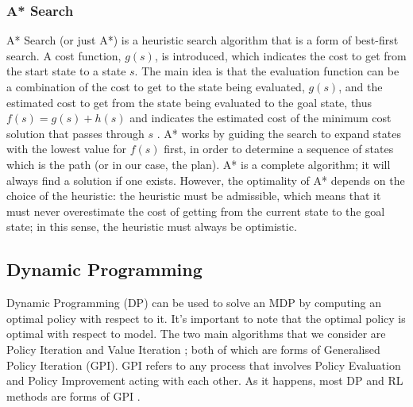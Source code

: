 \subsubsection{A* Search}
\label{sec:astar}
A* Search (or just A*) \cite{4082128} is a heuristic search algorithm that is a form of best-first search. A cost function, $g(s)$, is introduced, which indicates the cost to get from the start state to a state $s$. The main idea is that the evaluation function can be a combination of the cost to get to the state being evaluated, $g(s)$, and the estimated cost to get from the state being evaluated to the goal state, thus $f(s) = g(s) + h(s)$ and indicates the estimated cost of the minimum cost solution that passes through $s$ \cite{DBLP:books/aw/RN2020}. A* works by guiding the search to expand states with the lowest value for $f(s)$ first, in order to determine a sequence of states which is the path (or in our case, the plan). A* is a complete algorithm; it will always find a solution if one exists. However, the optimality of A* depends on the choice of the heuristic: the heuristic must be admissible, which means that it must never overestimate the cost of getting from the current state to the goal state; in this sense, the heuristic must always be optimistic.
\\
\subsection{Dynamic Programming}
Dynamic Programming (DP) \cite{Bellman:1957, DBLP:books/lib/Bertsekas05} can be used to solve an MDP by computing an optimal policy with respect to it. It's important to note that the optimal policy is optimal with respect to model.
The two main algorithms that we consider are Policy Iteration \cite{Bellman:1957, howard:dp} and Value Iteration \cite{Bellman:1957}; both of which are forms of Generalised Policy Iteration (GPI). GPI refers to any process that involves Policy Evaluation and Policy Improvement acting with each other. As it happens, most DP and RL methods are forms of GPI \cite{Sutton1998}.


